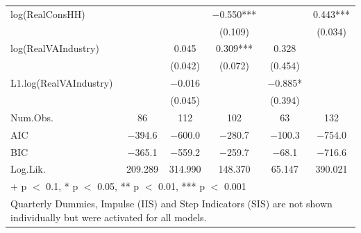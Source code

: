 \begin{table}
{\begin{tabular}[t]{lccccc}
log(RealConsHH) &  &  & \num{-0.550}*** &  & \num{0.443}***\\
 &  &  & (\num{0.109}) &  & (\num{0.034})\\
log(RealVAIndustry) &  & \num{0.045} & \num{0.309}*** & \num{0.328} & \\
 &  & (\num{0.042}) & (\num{0.072}) & (\num{0.454}) & \\
L1.log(RealVAIndustry) &  & \num{-0.016} &  & \num{-0.885}* & \\
 &  & (\num{0.045}) &  & (\num{0.394}) & \\
\midrule
Num.Obs. & \num{86} & \num{112} & \num{102} & \num{63} & \num{132}\\
AIC & \num{-394.6} & \num{-600.0} & \num{-280.7} & \num{-100.3} & \num{-754.0}\\
BIC & \num{-365.1} & \num{-559.2} & \num{-259.7} & \num{-68.1} & \num{-716.6}\\
Log.Lik. & \num{209.289} & \num{314.990} & \num{148.370} & \num{65.147} & \num{390.021}\\
\bottomrule
\multicolumn{6}{l}{\rule{0pt}{1em}+ p $<$ 0.1, * p $<$ 0.05, ** p $<$ 0.01, *** p $<$ 0.001}\\
\multicolumn{6}{l}{\rule{0pt}{1em}Quarterly Dummies, Impulse (IIS) and Step Indicators (SIS) are not shown individually but were activated for all models.}\\
\end{tabular}}
\end{table}

